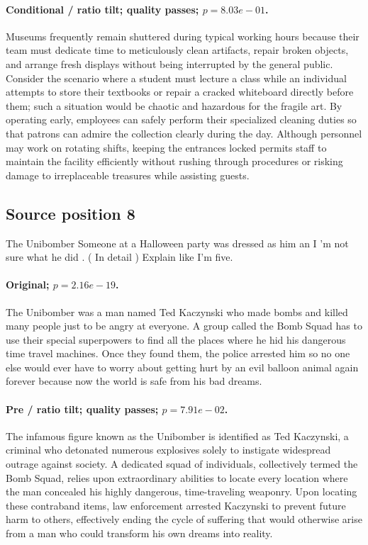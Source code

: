 \paragraph{Conditional / ratio tilt; quality passes; $p=8.03e-01$.} Museums frequently remain shuttered during typical working hours because their team must dedicate time to meticulously clean artifacts, repair broken objects, and arrange fresh displays without being interrupted by the general public. Consider the scenario where a student must lecture a class while an individual attempts to store their textbooks or repair a cracked whiteboard directly before them; such a situation would be chaotic and hazardous for the fragile art. By operating early, employees can safely perform their specialized cleaning duties so that patrons can admire the collection clearly during the day. Although personnel may work on rotating shifts, keeping the entrances locked permits staff to maintain the facility efficiently without rushing through procedures or risking damage to irreplaceable treasures while assisting guests.

\subsection*{Source position 8}
The Unibomber Someone at a Halloween party was dressed as him an I 'm not sure what he did . ( In detail ) Explain like I'm five.

\paragraph{Original; $p=2.16e-19$.} The Unibomber was a man named Ted Kaczynski who made bombs and killed many people just to be angry at everyone. A group called the Bomb Squad has to use their special superpowers to find all the places where he hid his dangerous time travel machines. Once they found them, the police arrested him so no one else would ever have to worry about getting hurt by an evil balloon animal again forever because now the world is safe from his bad dreams.


\paragraph{Pre / ratio tilt; quality passes; $p=7.91e-02$.} The infamous figure known as the Unibomber is identified as Ted Kaczynski, a criminal who detonated numerous explosives solely to instigate widespread outrage against society. A dedicated squad of individuals, collectively termed the Bomb Squad, relies upon extraordinary abilities to locate every location where the man concealed his highly dangerous, time-traveling weaponry. Upon locating these contraband items, law enforcement arrested Kaczynski to prevent future harm to others, effectively ending the cycle of suffering that would otherwise arise from a man who could transform his own dreams into reality.

